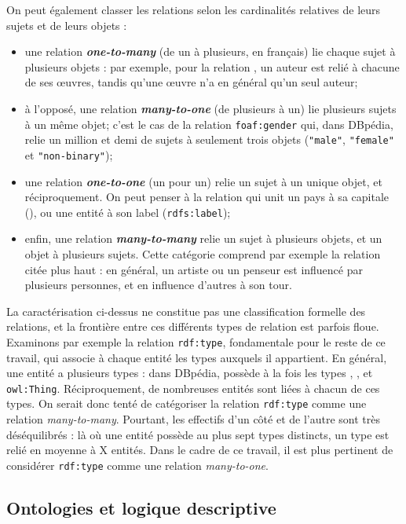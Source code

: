 On peut également classer les relations selon les cardinalités relatives de leurs sujets et de leurs objets :
\begin{itemize}
    \item une relation \textbf{\textit{one-to-many}} (de un à plusieurs, en français) lie chaque sujet à plusieurs objets : par exemple, pour la relation , un auteur est relié à chacune de ses œuvres, tandis qu'une œuvre n'a en général qu'un seul auteur;
    \item à l'opposé, une relation \textbf{\textit{many-to-one}} (de plusieurs à un) lie plusieurs sujets à un même objet; c'est le cas de la relation \texttt{foaf:gender} qui, dans DBpédia, relie un million et demi de sujets à seulement trois objets (\texttt{"male"}, \texttt{"female"} et \texttt{"non-binary"});
    \item une relation \textbf{\textit{one-to-one}} (un pour un) relie un sujet à un unique objet, et réciproquement. On peut penser à la relation qui unit un pays à sa capitale (), ou une entité à son label (\texttt{rdfs:label});
    \item enfin, une relation \textbf{\textit{many-to-many}} relie un sujet à plusieurs objets, et un objet à plusieurs sujets. Cette catégorie comprend par exemple la relation  citée plus haut : en général, un artiste ou un penseur est influencé par plusieurs personnes, et en influence d'autres à son tour.
\end{itemize}
La caractérisation ci-dessus ne constitue pas une classification formelle des relations, et la frontière entre ces différents types de relation est parfois floue. Examinons par exemple la relation \texttt{rdf:type}, fondamentale pour le reste de ce travail, qui associe à chaque entité les types auxquels il appartient. En général, une entité a plusieurs types : dans DBpédia,  possède à la fois les types , ,  et \texttt{owl:Thing}. Réciproquement, de nombreuses entités sont liées à chacun de ces types. On serait donc tenté de catégoriser la relation \texttt{rdf:type} comme une relation \textit{many-to-many}. Pourtant, les effectifs d'un côté et de l'autre sont très déséquilibrés : là où une entité possède au plus sept types distincts, un type est relié en moyenne à X entités. Dans le cadre de ce travail, il est plus pertinent de considérer \texttt{rdf:type} comme une relation \textit{many-to-one}.

\subsection{Ontologies et logique descriptive}

